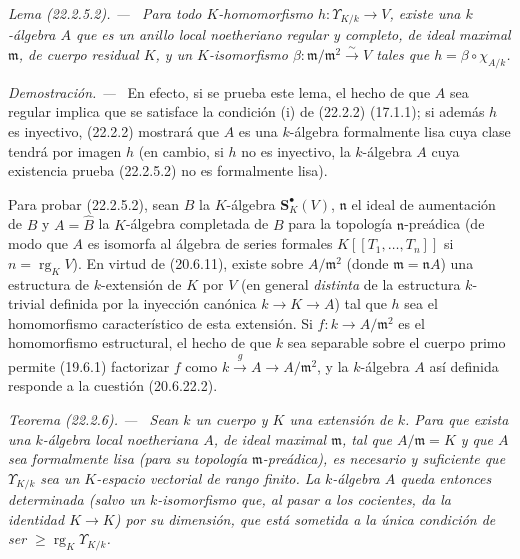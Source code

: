 \documentclass[10pt,oneside]{book}
\makeatletter
\newcommand{\setmanualcurrentlabel}[1]{\def\@currentlabel{#1}}
\newenvironment{theorem}[1][]{%
  \setmanualcurrentlabel{#1}\par\medskip\noindent\itshape Teorema (#1). ---\ }{\par}
\newenvironment{lemma}[1][]{%
  \setmanualcurrentlabel{#1}\par\medskip\noindent\itshape Lema (#1). ---\ }{\par}
\newenvironment{proof}{%
  \par\medskip\noindent\textit{Demostración. ---\ }}{\par}
\makeatother
\begin{document}
\begin{lemma}[22.2.5.2]
\label{0.22.2.5.2-es}
Para todo $K$-homomorfismo $h:\Upsilon_{K/k}\to V$, existe una $k$-álgebra
$A$ que es un anillo local noetheriano regular y completo, de ideal maximal
$\mathfrak m$, de cuerpo residual $K$, y un $K$-isomorfismo
$\beta:\mathfrak m/\mathfrak m^2\xrightarrow{\sim}V$ tales que
$h=\beta\circ\chi_{A/k}$.
\end{lemma}

\begin{proof}
En efecto, si se prueba este lema, el hecho de que $A$ sea regular implica que
se satisface la condición (i) de (22.2.2) (17.1.1); si además $h$ es
inyectivo, (22.2.2) mostrará que $A$ es una $k$-álgebra formalmente lisa cuya
clase tendrá por imagen $h$ (en cambio, si $h$ no es inyectivo, la $k$-álgebra
$A$ cuya existencia prueba (22.2.5.2) no es formalmente lisa).

Para probar (22.2.5.2), sean $B$ la $K$-álgebra $\mathbf S_K^\bullet(V)$,
$\mathfrak n$ el ideal de aumentación de $B$ y $A=\widehat B$ la $K$-álgebra
completada de $B$ para la topología $\mathfrak n$-preádica (de modo que $A$ es
isomorfa al álgebra de series formales $K[[T_1,\ldots,T_n]]$ si
$n=\operatorname{rg}_KV$). En virtud de (20.6.11), existe sobre
$A/\mathfrak m^2$ (donde $\mathfrak m=\mathfrak nA$) una estructura de
$k$-extensión de $K$ por $V$ (en general \emph{distinta} de la estructura
$k$-trivial definida por la inyección canónica $k\to K\to A$) tal que $h$ sea
el homomorfismo característico de esta extensión. Si
$f:k\to A/\mathfrak m^2$ es el homomorfismo estructural, el hecho de que $k$
sea separable sobre el cuerpo primo permite (19.6.1) factorizar $f$ como
$k\xrightarrow{g}A\to A/\mathfrak m^2$, y la $k$-álgebra $A$ así definida
responde a la cuestión (20.6.22.2).
\end{proof}

\begin{theorem}[22.2.6]
\label{0.22.2.6-es}
Sean $k$ un cuerpo y $K$ una extensión de $k$. Para que exista una $k$-álgebra
local noetheriana $A$, de ideal maximal $\mathfrak m$, tal que
$A/\mathfrak m=K$ y que $A$ sea formalmente lisa (para su topología
$\mathfrak m$-preádica), es necesario y suficiente que $\Upsilon_{K/k}$ sea
un $K$-espacio vectorial de rango finito. La $k$-álgebra $A$ queda entonces
determinada (salvo un $k$-isomorfismo que, al pasar a los cocientes, da la
identidad $K\to K$) por su dimensión, que está sometida a la única condición
de ser $\geqslant\operatorname{rg}_K\Upsilon_{K/k}$.
\end{theorem}
\end{document}
